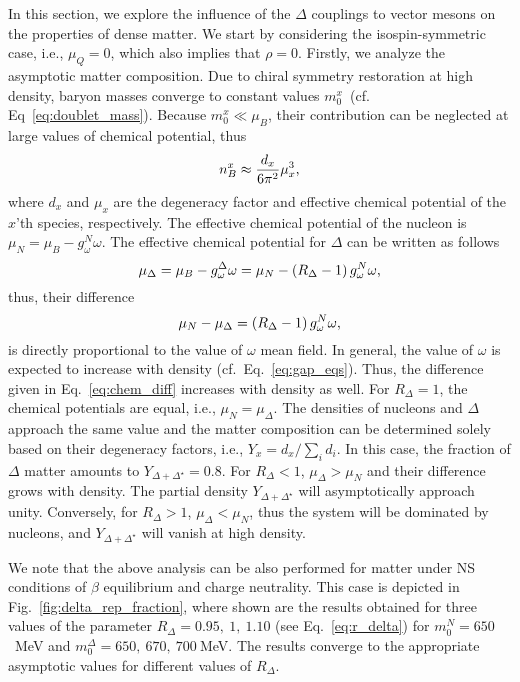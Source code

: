\documentclass[preprint,showkeys,lengthcheck,nofootinbib,twocolumn,notitlepage,floatfix,superscriptaddress]{revtex4-1}
\begin{document}
In this section, we explore the influence of the $\Delta$ couplings to vector mesons on the properties of dense matter. We start by considering the isospin-symmetric case, i.e., $\mu_Q=0$, which also implies that $\rho=0$. Firstly, we analyze the asymptotic matter composition. Due to chiral symmetry restoration at high density, baryon masses converge to constant values $m_0^x$~(cf. Eq~\eqref{eq:doublet_mass}). Because $m_0^x \ll \mu_B$, their contribution can be neglected at large values of chemical potential, thus
\begin{equation}
n_B^x \approx \frac{d_x}{6\pi^2} \mu_x^3\textrm,
\end{equation}
where $d_x$ and $\mu_x$ are the degeneracy factor and effective chemical potential of the $x$'th species, respectively. The effective chemical potential of the nucleon is \mbox{$\mu_N = \mu_B - g_\omega^N\omega$}. The effective chemical potential for $\Delta$ can be written as follows
\begin{equation}
\mu_\Delta = \mu_B - g_\omega^\Delta\omega = \mu_N - \left(R_\Delta-1\right)g_\omega^N\omega\textrm,
\end{equation}
thus, their difference
\begin{equation}\label{eq:chem_diff}
\mu_N - \mu_\Delta = \left(R_\Delta-1\right)g_\omega^N\omega\textrm, 
\end{equation}
is directly proportional to the value of $\omega$ mean field. In general, the value of $\omega$ is expected to increase with density (cf.~Eq.~\eqref{eq:gap_eqs}). Thus, the difference given in Eq.~\eqref{eq:chem_diff} increases with density as well. For $R_\Delta=1$, the chemical potentials are equal, i.e., $\mu_N = \mu_\Delta$. The densities of nucleons and $\Delta$ approach the same value and the matter composition can be determined solely based on their degeneracy factors, i.e., $Y_x = d_x/\sum_i d_i$. In this case, the fraction of $\Delta$ matter amounts to $Y_{\Delta + \Delta^\star}=0.8$. For $R_\Delta < 1$, $\mu_\Delta > \mu_N$ and their difference grows with density. The partial density $Y_{\Delta +\Delta^\star}$ will asymptotically approach unity. Conversely, for $R_\Delta>1$, $\mu_\Delta < \mu_N$, thus the system will be dominated by nucleons, and $Y_{\Delta + \Delta^\star}$ will vanish at high density. 

We note that the above analysis can be also performed for matter under NS conditions of $\beta$ equilibrium and charge neutrality. This case is depicted in Fig.~\ref{fig:delta_rep_fraction}, where shown are the results obtained for three values of the parameter $R_\Delta=0.95,~1,~1.10$ (see Eq.~\eqref{eq:r_delta}) for $m_0^N=650$~MeV and $m_0^\Delta=650,~670,~700~$MeV. The results converge to the appropriate asymptotic values for different values of $R_\Delta$. 
\end{document}
